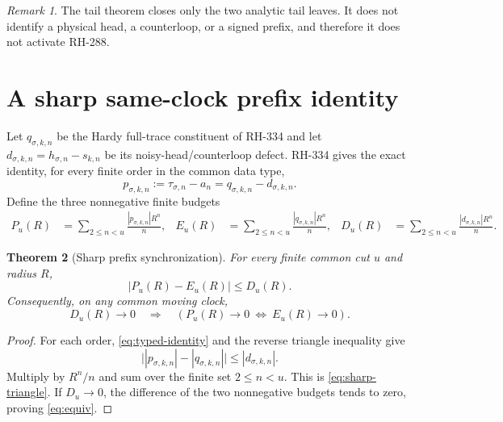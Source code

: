 \documentclass[11pt]{article}
\newtheorem{theorem}{Theorem}[section]
\theoremstyle{remark}
\newtheorem{remark}[theorem]{Remark}
\begin{document}
\begin{remark}
The tail theorem closes only the two analytic tail leaves.  It does not
identify a physical head, a counterloop, or a signed prefix, and therefore it
does not activate RH-288.
\end{remark}

\section{A sharp same-clock prefix identity}

Let $q_{\sigma,k,n}$ be the Hardy full-trace constituent of RH-334
\citep{WangObservation2026} and let
$d_{\sigma,k,n}=h_{\sigma,n}-s_{k,n}$ be its noisy-head/counterloop defect.
RH-334 gives the exact identity, for every finite order in the common data
type,
\begin{equation}\label{eq:typed-identity}
 p_{\sigma,k,n}:=\tau_{\sigma,n}-a_n
 =q_{\sigma,k,n}-d_{\sigma,k,n}.
\end{equation}
Define the three nonnegative finite budgets
\begin{align}
 P_u(R)&=\sum_{2\le n<u}\frac{|p_{\sigma,k,n}|R^n}{n},
 &E_u(R)&=\sum_{2\le n<u}\frac{|q_{\sigma,k,n}|R^n}{n},
 &D_u(R)&=\sum_{2\le n<u}\frac{|d_{\sigma,k,n}|R^n}{n}.
 \label{eq:budgets}
\end{align}

\begin{theorem}[Sharp prefix synchronization]
\label{thm:synchronization}
For every finite common cut $u$ and radius $R$,
\begin{equation}\label{eq:sharp-triangle}
 \bigl|P_u(R)-E_u(R)\bigr|\le D_u(R).
\end{equation}
Consequently, on any common moving clock,
\begin{equation}\label{eq:equiv}
 D_u(R)\to0
 \quad\Longrightarrow\quad
 \left(P_u(R)\to0\ \Longleftrightarrow\ E_u(R)\to0\right).
\end{equation}
\end{theorem}

\begin{proof}
For each order, \eqref{eq:typed-identity} and the reverse triangle inequality
give
\[
 \bigl||p_{\sigma,k,n}|-|q_{\sigma,k,n}|\bigr|
 \le |d_{\sigma,k,n}|.
\]
Multiply by $R^n/n$ and sum over the finite set $2\le n<u$.  This is
\eqref{eq:sharp-triangle}.  If $D_u\to0$, the difference of the two
nonnegative budgets tends to zero, proving \eqref{eq:equiv}.
\end{proof}
\end{document}

